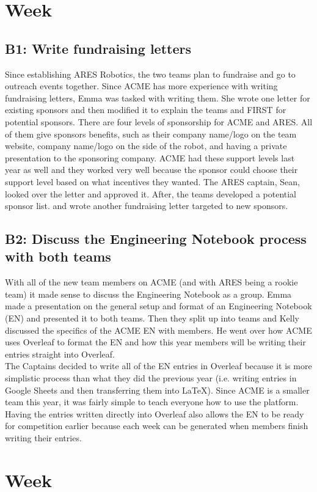 \documentclass{article}
\newif\ifcontents
\begin{document}
\tableofcontents\newpage\contentsfalse\clearpage \newpage \section{Week \thesection} 
\subsection{B1: Write fundraising letters}

Since establishing ARES Robotics, the two teams plan to fundraise and go to outreach events together. Since ACME has more experience with writing fundraising letters, Emma was tasked with writing them. She wrote one letter for existing sponsors and then modified it to explain the teams and FIRST for potential sponsors. There are four levels of sponsorship for ACME and ARES. All of them give sponsors benefits, such as their company name/logo on the team website, company name/logo on the side of the robot, and having a private presentation to the sponsoring company. ACME had these support levels last year as well and they worked very well because the sponsor could choose their support level based on what incentives they wanted. The ARES captain, Sean, looked over the letter and approved it. After, the teams developed a potential sponsor list. and wrote another fundraising letter targeted to new sponsors.  

\subsection{B2: Discuss the Engineering Notebook process with both teams}

With all of the new team members on ACME (and with ARES being a rookie team) it made sense to discuss the Engineering Notebook as a group. Emma made a presentation on the general setup and format of an Engineering Notebook (EN) and presented it to both teams. Then they split up into teams and Kelly discussed the specifics of the ACME EN with members. He went over how ACME uses Overleaf to format the EN and how this year members will be writing their entries straight into Overleaf. \\

The Captains decided to write all of the EN entries in Overleaf because it is more simplistic process than what they did the previous year (i.e. writing entries in Google Sheets and then transferring them into \LaTeX). Since ACME is a smaller team this year, it was fairly simple to teach everyone how to use the platform. Having the entries written directly into Overleaf also allows the EN to be ready for competition earlier because each week can be generated when members finish writing their entries. 
\clearpage \newpage \section{Week \thesection} 
\end{document}
